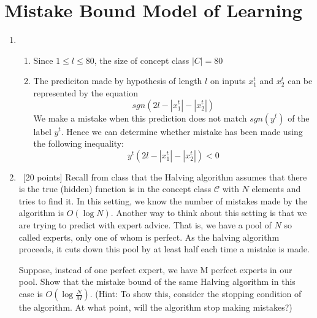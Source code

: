 \section{Mistake Bound Model of Learning}\label{sec:q2}

\begin{enumerate}
    \item~
    
    
	\begin{enumerate}
		\item
			Since $1 \leq l \leq 80$, the size of concept class $|C| = 80$	
		
		\item
			The prediciton made by hypothesis of length $l$ on inputs $x_1^t$ and $x_2^t$ can be represented by the equation $$ sgn(2l - |x_1^t| - |x_2^t|) $$ 
			We make a mistake when this prediction does not match $sgn(y^t)$ of the label $y^t$. Hence we can determine whether mistake has been made using the following inequality:					
			\begin{equation}
				\boxed{				
					y^t(2l - |x_1^t| - |x_2^t|) < 0	
				}	
			\end{equation}
	\end{enumerate}	    
    
     
    
    
    

    \item~[20 points] Recall from class that the Halving algorithm assumes that there is the true (hidden) function is in the concept class $\mathcal{C}$ with $N$ elements and tries to find it. In this setting, we know the number of mistakes made by the algorithm is $O(\log N)$.
        Another way to think about this setting is that we are trying to predict with expert advice. That is, we have a pool of $N$ so called experts, only one of whom is perfect. As the halving algorithm proceeds, it cuts down this pool by at least half each time a mistake is made.

        Suppose, instead of one perfect expert, we have M perfect experts in our pool. Show that the mistake bound of the same Halving algorithm in this case is $O(\log\frac{N}{M})$.
        (Hint: To show this, consider the stopping condition of the algorithm. At what point, will the algorithm stop making mistakes?)
\end{enumerate}

